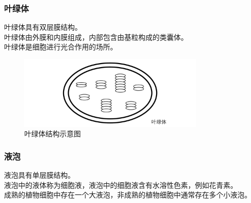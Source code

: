 \documentclass[UTF8]{ctexart}
\begin{document}
\subsubsection{叶绿体}
    叶绿体具有双层膜结构。\\[3mm]
    叶绿体由外膜和内膜组成，内部包含由基粒构成的类囊体。\\[3mm]
    叶绿体是细胞进行光合作用的场所。
    \begin{figure}[h]
        \begin{center}
            \includegraphics[width=9cm]{BiologyImage/8.jpg}
            \caption{叶绿体结构示意图}
        \end{center}
    \end{figure}

\subsubsection{液泡}
    液泡具有单层膜结构。\\[3mm]
    液泡中的液体称为细胞液，液泡中的细胞液含有水溶性色素，例如花青素。\\[3mm]
    成熟的植物细胞中存在一个大液泡，非成熟的植物细胞中通常存在多个小液泡。

\newpage
\end{document}
